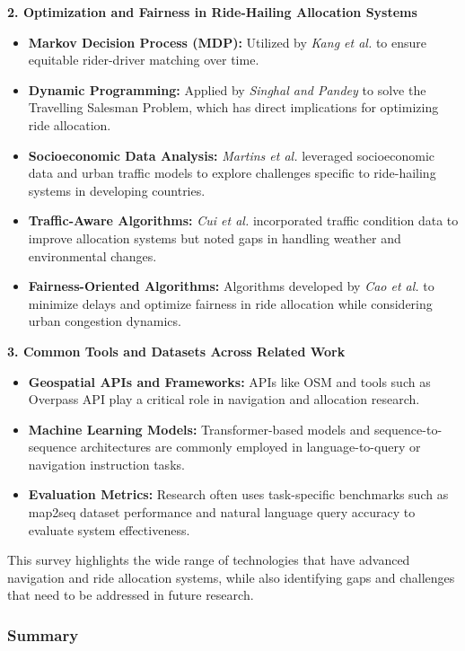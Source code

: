 \textbf{2. Optimization and Fairness in Ride-Hailing Allocation Systems}
\begin{itemize}
	\item \textbf{Markov Decision Process (MDP):} Utilized by \textit{Kang et al.} \cite{kang-2024} to ensure equitable rider-driver matching over time.
	\item \textbf{Dynamic Programming:} Applied by \textit{Singhal and Pandey} \cite{singhal-2016} to solve the Travelling Salesman Problem, which has direct implications for optimizing ride allocation.
	\item \textbf{Socioeconomic Data Analysis:} \textit{Martins et al.} \cite{martins-2024} leveraged socioeconomic data and urban traffic models to explore challenges specific to ride-hailing systems in developing countries.
	\item \textbf{Traffic-Aware Algorithms:} \textit{Cui et al.} \cite{cui-2022} incorporated traffic condition data to improve allocation systems but noted gaps in handling weather and environmental changes.
	\item \textbf{Fairness-Oriented Algorithms:} Algorithms developed by \textit{Cao et al.} \cite{cao-2021} to minimize delays and optimize fairness in ride allocation while considering urban congestion dynamics.
\end{itemize}

\textbf{3. Common Tools and Datasets Across Related Work}
\begin{itemize}
	\item \textbf{Geospatial APIs and Frameworks:} APIs like OSM and tools such as Overpass API play a critical role in navigation and allocation research.
	\item \textbf{Machine Learning Models:} Transformer-based models and sequence-to-sequence architectures are commonly employed in language-to-query or navigation instruction tasks.
	\item \textbf{Evaluation Metrics:} Research often uses task-specific benchmarks such as map2seq dataset performance and natural language query accuracy to evaluate system effectiveness.
\end{itemize}

This survey highlights the wide range of technologies that have advanced navigation and ride allocation systems, while also identifying gaps and challenges that need to be addressed in future research.


\subsubsection{Summary}

